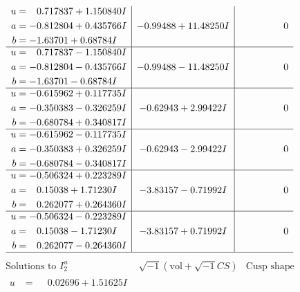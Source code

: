 \documentclass[1p]{elsarticle_modified}
\theoremstyle{definition}
\newcommand{\I}{\sqrt{-1}}
\begin{document}
$$\begin{array}{c|c|c}
\begin{aligned}
u &= \phantom{-}0.717837 + 1.150840 I \\
a &= -0.812804 + 0.435766 I \\
b &= -1.63701 + 0.68784 I\end{aligned}
 & -0.99488 + 11.48250 I & \phantom{-0.000000 } 0 \\ \hline\begin{aligned}
u &= \phantom{-}0.717837 - 1.150840 I \\
a &= -0.812804 - 0.435766 I \\
b &= -1.63701 - 0.68784 I\end{aligned}
 & -0.99488 - 11.48250 I & \phantom{-0.000000 } 0 \\ \hline\begin{aligned}
u &= -0.615962 + 0.117735 I \\
a &= -0.350383 - 0.326259 I \\
b &= -0.680784 + 0.340817 I\end{aligned}
 & -0.62943 + 2.99422 I & \phantom{-0.000000 } 0 \\ \hline\begin{aligned}
u &= -0.615962 - 0.117735 I \\
a &= -0.350383 + 0.326259 I \\
b &= -0.680784 - 0.340817 I\end{aligned}
 & -0.62943 - 2.99422 I & \phantom{-0.000000 } 0 \\ \hline\begin{aligned}
u &= -0.506324 + 0.223289 I \\
a &= \phantom{-}0.15038 + 1.71230 I \\
b &= \phantom{-}0.262077 + 0.264360 I\end{aligned}
 & -3.83157 - 0.71992 I & \phantom{-0.000000 } 0 \\ \hline\begin{aligned}
u &= -0.506324 - 0.223289 I \\
a &= \phantom{-}0.15038 - 1.71230 I \\
b &= \phantom{-}0.262077 - 0.264360 I\end{aligned}
 & -3.83157 + 0.71992 I & \phantom{-0.000000 } 0\\
 \hline 
 \end{array}$$\newpage$$\begin{array}{c|c|c}  
\text{Solutions to }I^u_{2}& \I (\text{vol} + \sqrt{-1}CS) & \text{Cusp shape}\\
 \hline 
\begin{aligned}
u &= \phantom{-}0.02696 + 1.51625 I \\

\end{aligned}
\end{array}$$
\end{document}
